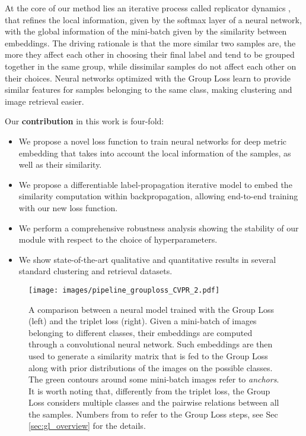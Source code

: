 \documentclass[runningheads]{llncs}
\begin{document}
At the core of our method lies an iterative process called {replicator dynamics} \cite{weibull1997evolutionary,DBLP:journals/neco/ErdemP12}, that refines the local information, given by the softmax layer of a neural network, with the global information of the mini-batch given by the similarity between embeddings. 
The driving rationale is that the more similar two samples are, the more they affect each other in choosing their final label and tend to be grouped together in the same group, while dissimilar samples do not affect each other on their choices.
Neural networks optimized with the Group Loss learn to provide similar features for samples belonging to the same class, making clustering and image retrieval easier.

Our \textbf{contribution} in this work is four-fold: 
\begin{itemize}
    \item We propose a novel loss function to train neural networks for deep metric embedding that takes into account the local information of the samples, as well as their similarity.
    \item We propose a differentiable label-propagation iterative model to embed the similarity computation within backpropagation, allowing end-to-end training with our new loss function.
    \item We perform a comprehensive robustness analysis showing the stability of our module with respect to the choice of hyperparameters. 
    \item We show state-of-the-art qualitative and quantitative results in several standard clustering and retrieval datasets. 
\end{itemize}



\begin{figure*}[ht!]
\texttt{[image: images/pipeline\_grouploss\_CVPR\_2.pdf]} \centering
\caption{A comparison between a neural model trained with the Group Loss (left) and the triplet loss (right). Given a mini-batch of images belonging to different classes, their embeddings are computed through a convolutional neural network. Such embeddings are then used to generate a similarity matrix that is fed to the Group Loss along with prior distributions of the images on the possible classes. The green contours around some mini-batch images refer to \emph{anchors}. It is worth noting that, differently from the triplet loss, the Group Loss considers multiple classes and the pairwise relations between all the samples. Numbers from \raisebox{.4pt}{\textcircled{\raisebox{-1pt} {1}}} to \raisebox{.4pt}{\textcircled{\raisebox{-1pt} {3}}} refer to the Group Loss steps, see Sec \ref{sec:gl_overview} for the details.
} 
\label{fig:pipeline}
\end{figure*} 
\end{document}
